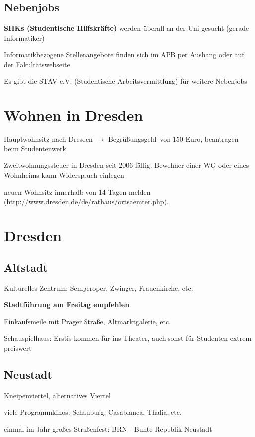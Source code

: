 \documentclass[a4paper,12pt]{report}
\begin{document}
\subsection{Nebenjobs}
\begin{itemize*}
\item \textbf{SHKs (Studentische Hilfskräfte)} werden überall an der Uni gesucht (gerade Informatiker)
\item Informatikbezogene Stellenangebote finden sich im APB per Aushang oder auf der Fakultätswebseite
\item Es gibt die STAV e.V. (Studentische Arbeitsvermittlung) für weitere Nebenjobs
\end{itemize*}

\section{Wohnen in Dresden}
\begin{itemize*}
  \item Hauptwohnsitz nach Dresden $\rightarrow$ \glqq Begrüßungsgeld\grqq\ von 150 Euro, beantragen beim Studentenwerk
  \item Zweitwohnungssteuer in Dresden seit 2006 fällig. Bewohner einer WG oder eines Wohnheims kann Widerspruch einlegen
	\item neuen Wohnsitz innerhalb von 14 Tagen melden\\
  (http://www.dresden.de/de/rathaus/ortsaemter.php).
\end{itemize*}

\section{Dresden}

\subsection{Altstadt}
\begin{itemize*}
	\item Kulturelles Zentrum: Semperoper, Zwinger, Frauenkirche, etc.
  \item \textbf{Stadtführung am Freitag empfehlen}
	\item Einkaufsmeile mit Prager Straße, Altmarktgalerie, etc.
	\item Schauspielhaus: Erstis kommen für  ins Theater, auch sonst für Studenten extrem preiswert
\end{itemize*}

\subsection{Neustadt}
\begin{itemize*}
	\item Kneipenviertel, alternatives Viertel
	\item viele Programmkinos: Schauburg, Casablanca, Thalia, etc.
	\item einmal im Jahr großes Straßenfest: BRN - Bunte Republik Neustadt
\end{itemize*}
\end{document}
